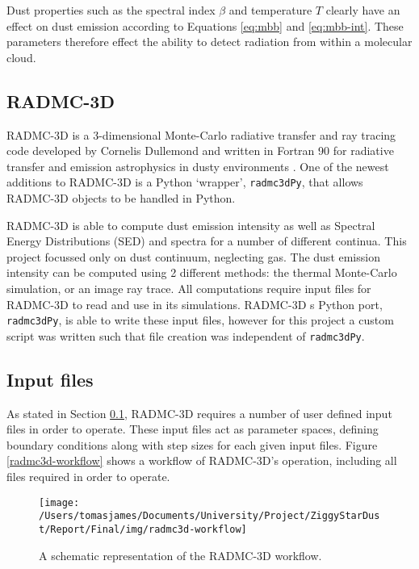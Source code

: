 \documentclass{report}
\begin{document}
Dust properties such as the spectral index $\beta$ and temperature $T$ clearly have an effect on dust emission according to Equations \ref{eq:mbb} and \ref{eq:mbb-int}. These parameters therefore effect the ability to detect radiation from within a molecular cloud.

\subsection{RADMC-3D} \label{radmc}
RADMC-3D is a 3-dimensional Monte-Carlo radiative transfer and ray tracing code developed by Cornelis Dullemond and written in Fortran 90 for radiative transfer and emission astrophysics in dusty environments \parencite{RADMC-3D}. One of the newest additions to RADMC-3D is a Python ‘wrapper’, \texttt{radmc3dPy}, that allows RADMC-3D objects to be handled in Python.

RADMC-3D is able to compute dust emission intensity as well as Spectral Energy Distributions (SED) and spectra for a number of different continua. This project focussed only on dust continuum, neglecting gas. The dust emission intensity can be computed using 2 different methods: the thermal Monte-Carlo simulation, or an image ray trace. All computations require input files for RADMC-3D to read and use in its simulations. RADMC-3D \textquotesingle s Python port, \texttt{radmc3dPy}, is able to write these input files, however for this project a custom script was written such that file creation was independent of \texttt{radmc3dPy}.

\subsection{Input files} \label{inp}
As stated in Section \ref{radmc}, RADMC-3D requires a number of user defined input files in order to operate. These input files act as parameter spaces, defining boundary conditions along with step sizes for each given input files. Figure \ref{radmc3d-workflow} shows a workflow of RADMC-3D's operation, including all files required in order to operate.

\begin{figure}[h]
  \centering
  \texttt{[image: /Users/tomasjames/Documents/University/Project/ZiggyStarDust/Report/Final/img/radmc3d-workflow]}
  \caption[A schematic representation of the RADMC-3D workflow.]{A schematic representation of the RADMC-3D workflow.}
  \label{fig:radmc3d-workflow}
\end{figure}
\end{document}
